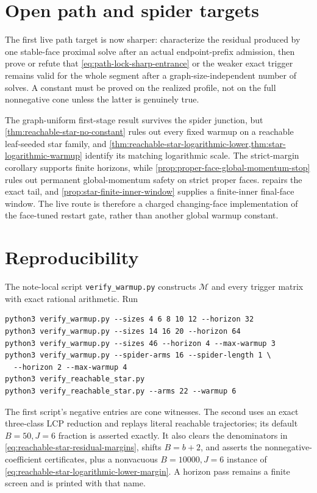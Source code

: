 \section{Open path and spider targets}
\label{sec:path-spider-targets}

The first live path target is now sharper: characterize the residual produced
by one stable-face proximal solve after an actual endpoint-prefix admission,
then prove or refute that
\eqref{eq:path-lock-sharp-entrance} or the weaker exact trigger remains valid
for the whole segment after a graph-size-independent number of solves.  A
constant must be proved on the realized profile, not on the full nonnegative
cone unless the latter is genuinely true.

The graph-uniform first-stage result survives the spider junction, but
\cref{thm:reachable-star-no-constant} rules out every fixed warmup on a
reachable leaf-seeded star family, and
\cref{thm:reachable-star-logarithmic-lower,thm:star-logarithmic-warmup}
identify its matching logarithmic scale.  The strict-margin corollary supports
finite horizons, while \cref{prop:proper-face-global-momentum-stop} rules out
permanent global-momentum safety on strict proper faces.
 repairs the exact tail, and
\cref{prop:star-finite-inner-window} supplies a finite-inner final-face window.
The live route is therefore a charged changing-face implementation of the
face-tuned restart gate, rather than another global warmup constant.

\section{Reproducibility}

The note-local script \texttt{verify\_warmup.py} constructs
\(\mathcal M\) and every trigger matrix with exact rational arithmetic.  Run
\begin{verbatim}
python3 verify_warmup.py --sizes 4 6 8 10 12 --horizon 32
python3 verify_warmup.py --sizes 14 16 20 --horizon 64
python3 verify_warmup.py --sizes 46 --horizon 4 --max-warmup 3
python3 verify_warmup.py --spider-arms 16 --spider-length 1 \
  --horizon 2 --max-warmup 4
python3 verify_reachable_star.py
python3 verify_reachable_star.py --arms 22 --warmup 6
\end{verbatim}
The first script's negative entries are cone witnesses.  The second uses an
exact three-class LCP reduction and replays literal reachable trajectories;
its default $B=50,J=6$ fraction is asserted exactly.  It also clears the
denominators in \eqref{eq:reachable-star-residual-margins}, shifts $B=b+2$,
and asserts the nonnegative-coefficient certificates, plus a nonvacuous
$B=10000,J=6$ instance of
\eqref{eq:reachable-star-logarithmic-lower-margin}.  A horizon pass remains a
finite screen and is printed with that name.
